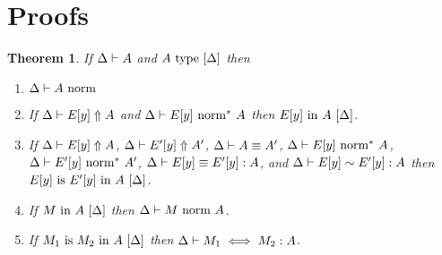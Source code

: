 \documentclass{article}
\newtheorem{theorem}{Theorem}
\theoremstyle{break}
\begin{document}
\section{Proofs}

\begin{theorem}
If $\Delta\vdash A$ and ${A}\mathrm{\ type\ }[\Delta]$ then
\begin{enumerate}
\item 
\label{ih-1}
${\Delta}\vdash{A}\mbox{\ norm}$
\item
\label{ih-2}
If $\Delta\vdash E[y] \Uparrow A$
and ${\Delta}\vdash{E[y]}\mbox{\ norm}^*\ {A}$ then
${E[y]}\mathrm{\ in\ }{A}\ [\Delta]$.
\item
\label{ih-3}
If $\Delta\vdash E[y] \Uparrow A$,
$\Delta\vdash E'[y] \Uparrow A'$,
$\Delta\vdash A \equiv A'$,
${\Delta}\vdash{E[y]}\mbox{\ norm}^*\ {A}$, ${\Delta}\vdash{E'[y]}\mbox{\ norm}^*\ {A'}$,
$\Delta\vdash E[y] \equiv E'[y] : A$, and
$\Delta\vdash E[y] \sim E'[y] : A$ then
${E[y]}\mathrm{\ is\ }{E'[y]}\mathrm{\ in\ }{A}\ [\Delta]$.
\item
\label{ih-4}
If ${M}\mathrm{\ in\ }{A}\ [\Delta]$ then
${\Delta}\vdash{M}\mbox{\ norm\ }{A}$.
\item
\label{ih-5}
If ${M_1}\mathrm{\ is\ }{M_2}\mathrm{\ in\ }{A}\ [\Delta]$ then
$\Delta\vdash M_1 \iff M_2 : A$.
\end{enumerate}
\end{theorem}
\end{document}
